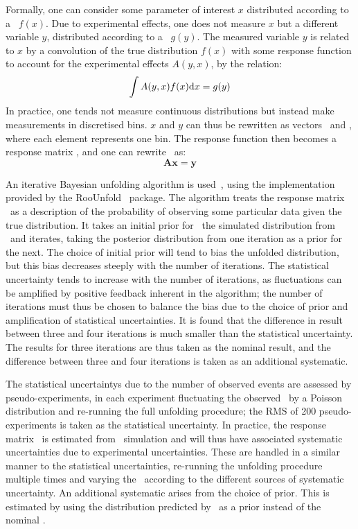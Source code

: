 Formally, one can consider some parameter of interest $x$
distributed according to a \probDF\ $f(x)$. Due to experimental effects, one
does not measure $x$ but a different variable $y$, distributed
according to a \probDF\ $g(y)$. The measured variable $y$ is related to $x$ by a
convolution of the true distribution $f(x)$ with some response function to account for the
experimental effects $A(y,x)$, by the relation:
\begin{equation}
\int A(y,x)f(x){\rm d}x = g(y)
\label{eqn:unfold-conv}
\end{equation}
In practice, one tends not measure continuous distributions but instead make measurements
in discretised bins. $x$ and $y$ can thus be rewritten as
vectors \unfx\ and \unfy, where each element represents one bin. The response
function then becomes a response matrix \unfA, and one can
rewrite~ as:
\begin{equation}
\mathbf{Ax} = \mathbf{y}
\label{eqn:unfold-conv-matrix}
\end{equation}

An iterative Bayesian unfolding algorithm is used~\cite{2010arXiv1010.0632D}, 
using the implementation provided by the {\sc
RooUnfold}~\cite{2011arXiv1105.1160A} package. The algorithm treats the response
matrix \unfA\ as a description of the probability of observing some particular data given the
true distribution. It takes an initial prior for \unfx\ the simulated distribution from
\mc\ and iterates, taking the posterior distribution from one iteration as a
prior for the next. The choice of initial prior will tend to bias the unfolded
distribution, but this bias decreases steeply with the number of iterations. The
statistical uncertainty tends to increase with the number of iterations, as
fluctuations can be amplified by positive feedback inherent in the algorithm;
the number of iterations must thus be chosen to balance the bias due to the
choice of prior and amplification of statistical uncertainties. It is found that
the difference in result between three and four iterations is much smaller than
the statistical uncertainty. The results for three iterations are thus taken as
the nominal result, and the difference between three and four iterations is
taken as an additional systematic. 

The statistical uncertaintys due to the number of observed events are assessed by
pseudo-experiments, in each experiment fluctuating the observed \unfy\ by a
Poisson distribution and re-running the full unfolding procedure; the RMS of 200
pseudo-experiments is taken as the statistical uncertainty. 
In practice, the response matrix \unfA\ is estimated from \mc\ simulation and
will thus have associated systematic uncertainties due to experimental
uncertainties. These are handled in a similar manner to the statistical
uncertainties, re-running the unfolding procedure multiple times and varying the
\unfA\ according to the different sources of systematic uncertainty. An
additional systematic arises from the choice of prior. This is estimated by
using the distribution predicted by \sherpa\ as a prior instead of the nominal
\powhegbox. 

